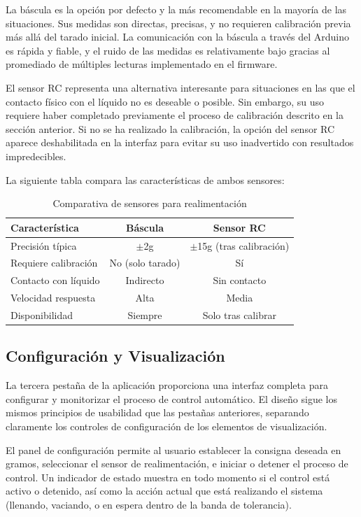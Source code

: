 \documentclass[12pt,a4paper]{article}
\begin{document}
La báscula es la opción por defecto y la más recomendable en la mayoría de las situaciones. Sus medidas son directas, precisas, y no requieren calibración previa más allá del tarado inicial. La comunicación con la báscula a través del Arduino es rápida y fiable, y el ruido de las medidas es relativamente bajo gracias al promediado de múltiples lecturas implementado en el firmware.

El sensor RC representa una alternativa interesante para situaciones en las que el contacto físico con el líquido no es deseable o posible. Sin embargo, su uso requiere haber completado previamente el proceso de calibración descrito en la sección anterior. Si no se ha realizado la calibración, la opción del sensor RC aparece deshabilitada en la interfaz para evitar su uso inadvertido con resultados impredecibles.

La siguiente tabla compara las características de ambos sensores:

\begin{table}[H]
\centering
\caption{Comparativa de sensores para realimentación}
\begin{tabular}{@{}lcc@{}}
\toprule
\textbf{Característica} & \textbf{Báscula} & \textbf{Sensor RC} \\
\midrule
Precisión típica & $\pm$2g & $\pm$15g (tras calibración) \\
Requiere calibración & No (solo tarado) & Sí \\
Contacto con líquido & Indirecto & Sin contacto \\
Velocidad respuesta & Alta & Media \\
Disponibilidad & Siempre & Solo tras calibrar \\
\bottomrule
\end{tabular}
\end{table}

\subsection{Configuración y Visualización}

La tercera pestaña de la aplicación proporciona una interfaz completa para configurar y monitorizar el proceso de control automático. El diseño sigue los mismos principios de usabilidad que las pestañas anteriores, separando claramente los controles de configuración de los elementos de visualización.

El panel de configuración permite al usuario establecer la consigna deseada en gramos, seleccionar el sensor de realimentación, e iniciar o detener el proceso de control. Un indicador de estado muestra en todo momento si el control está activo o detenido, así como la acción actual que está realizando el sistema (llenando, vaciando, o en espera dentro de la banda de tolerancia).
\end{document}
